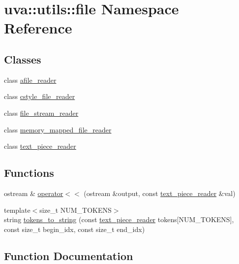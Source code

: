 \hypertarget{namespaceuva_1_1utils_1_1file}{}\section{uva\+:\+:utils\+:\+:file Namespace Reference}
\label{namespaceuva_1_1utils_1_1file}
\subsection*{Classes}
\begin{DoxyCompactItemize}
\item 
class \hyperlink{classuva_1_1utils_1_1file_1_1afile__reader}{afile\+\_\+reader}
\item 
class \hyperlink{classuva_1_1utils_1_1file_1_1cstyle__file__reader}{cstyle\+\_\+file\+\_\+reader}
\item 
class \hyperlink{classuva_1_1utils_1_1file_1_1file__stream__reader}{file\+\_\+stream\+\_\+reader}
\item 
class \hyperlink{classuva_1_1utils_1_1file_1_1memory__mapped__file__reader}{memory\+\_\+mapped\+\_\+file\+\_\+reader}
\item 
class \hyperlink{classuva_1_1utils_1_1file_1_1text__piece__reader}{text\+\_\+piece\+\_\+reader}
\end{DoxyCompactItemize}
\subsection*{Functions}
\begin{DoxyCompactItemize}
\item 
ostream \& \hyperlink{namespaceuva_1_1utils_1_1file_a249b967ece3871392a3d947819945251}{operator$<$$<$} (ostream \&output, const \hyperlink{classuva_1_1utils_1_1file_1_1text__piece__reader}{text\+\_\+piece\+\_\+reader} \&val)
\item 
{\footnotesize template$<$size\+\_\+t N\+U\+M\+\_\+\+T\+O\+K\+E\+N\+S$>$ }\\string \hyperlink{namespaceuva_1_1utils_1_1file_a2aaec3916cd13f25fe073c84db6d0af3}{tokens\+\_\+to\+\_\+string} (const \hyperlink{classuva_1_1utils_1_1file_1_1text__piece__reader}{text\+\_\+piece\+\_\+reader} tokens\mbox{[}N\+U\+M\+\_\+\+T\+O\+K\+E\+N\+S\mbox{]}, const size\+\_\+t begin\+\_\+idx, const size\+\_\+t end\+\_\+idx)
\end{DoxyCompactItemize}


\subsection{Function Documentation}
\hypertarget{namespaceuva_1_1utils_1_1file_a249b967ece3871392a3d947819945251}{}
